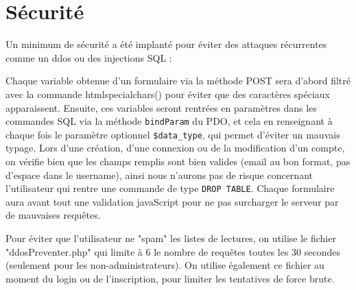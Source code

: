 \section{Sécurité}
    Un minimum de sécurité a été implanté pour éviter des attaques récurrentes comme un ddos ou des injections SQL :

Chaque variable obtenue d'un formulaire via la méthode POST sera d'abord filtré avec la commande htmlspecialchars() pour éviter que des caractères spéciaux apparaissent. Ensuite, ces variables seront rentrées en paramètres dans les commandes SQL via la méthode \texttt{bindParam} du PDO, et cela en renseignant à chaque fois le paramètre optionnel \texttt{\$data\_type}, qui permet d'éviter un mauvais typage.\newline
Lors d'une création, d'une connexion ou de la modification d'un compte, on vérifie bien que les champs remplis sont bien valides (email au bon format, pas d'espace dans le username), ainsi nous n'aurons pas de risque concernant l'utilisateur qui rentre une commande de type \texttt{DROP TABLE}.
Chaque formulaire aura avant tout une validation javaScript pour ne pas surcharger le serveur par de mauvaises requêtes.\newline


Pour éviter que l'utilisateur ne "spam" les listes de lectures, on utilise le fichier "ddosPreventer.php" qui limite à 6 le nombre de requêtes toutes les 30 secondes (seulement pour les non-administrateurs).
On utilise également ce fichier au moment du login ou de l'inscription, pour limiter les tentatives de force brute.

